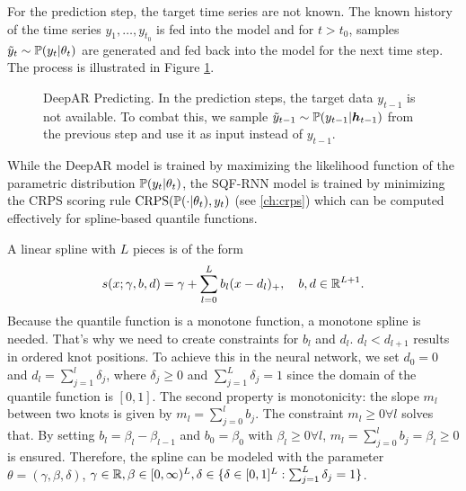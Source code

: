 For the prediction step, the target time series are not known. 
The known history of the time series \(y_1, \ldots, y_{t_0}\) is fed into the 
model and for \(t > t_0\), samples \(\tilde{y}_t \sim \P(y_t | \theta_t)\) 
are generated and fed back into the model for the next time step.
The process is illustrated in Figure \ref{fig:deepar-predicting}.

\begin{figure}[h]%
    \centering
    
    \caption[DeepAR Predicting]{DeepAR Predicting. 
    In the prediction steps, the target data \(y_{t-1}\) is not available. 
    To combat this, we sample \(\tilde{y}_{t-1} \sim \P(y_{t-1} | \boldsymbol{h}_{t-1})\) 
    from the previous step and use it as input instead of \(y_{t-1}\).}%
    \label{fig:deepar-predicting}%
\end{figure}

While the DeepAR model is trained by maximizing the likelihood function 
of the parametric distribution \(\P(y_t | \theta_t)\), 
the SQF-RNN model is trained by minimizing the CRPS scoring rule 
\(\mathrm{CRPS}(\P(\cdot | \theta_t), y_t)\) (see \ref{ch:crps}) 
which can be computed effectively for spline-based quantile functions.

A linear spline with \(L\) pieces is of the form 
\[ s(x; \gamma, b, d) = \gamma + \sum_{l=0}^L b_l (x - d_l)_+, 
\quad b, d \in \R^{L+1}. \]
Because the quantile function is a monotone function, 
a monotone spline is needed. That's why we need to create constraints 
for \(b_l\) and \(d_l\).
\(d_l < d_{l+1}\) results in ordered knot positions. To achieve this 
in the neural network, we set \(d_0 = 0\) and \(d_l = \sum_{j=1}^l \delta_j\), 
where \(\delta_j \geq 0\) and \(\sum_{j=1}^L \delta_j = 1\) since the domain 
of the quantile function is \([0, 1]\). 
The second property is monotonicity: the slope \(m_l\) between two knots is given by 
\(m_l = \sum_{j=0}^l b_j\). The constraint \(m_l \geq 0 \forall l\) solves that.
By setting \(b_l = \beta_l - \beta_{l-1}\) and \(b_0 = \beta_0\) with \(\beta_l \geq 0 \forall l\), 
\(m_l = \sum_{j=0}^l b_j = \beta_l \geq 0\) is ensured.
Therefore, the spline can be modeled with the parameter 
\(\theta = (\gamma, \beta, \delta)\), \(\gamma \in \R, \beta \in [0,\infty)^{L}, 
\delta \in \set{ \delta \in [0,1]^L: \sum_{j=1}^L \delta_j = 1 }\).